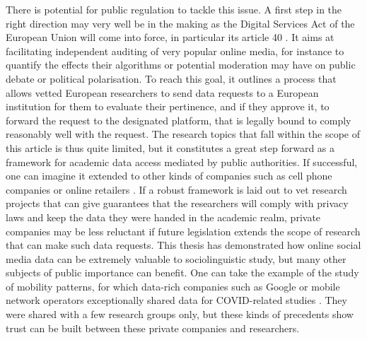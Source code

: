\documentclass[../thesis.tex]{subfiles}
\begin{document}
There is potential for public regulation to tackle this issue. A first step in the right
direction may very well be in the making as the Digital Services Act of the European
Union will come into force, in particular its article 40 \cite{DigitalServices2022}. It
aims at facilitating independent auditing of very popular online media, for instance to
quantify the effects their algorithms or potential moderation may have on public debate
or political polarisation. To reach this goal, it outlines a process that allows vetted
European researchers to send data requests to a European institution for them to
evaluate their pertinence, and if they approve it, to forward the request to the
designated platform, that is legally bound to comply reasonably well with the request.
The research topics that fall within the scope of this article is thus quite limited,
but it constitutes a great step forward as a framework for academic data access mediated
by public authorities. If successful, one can imagine it extended to other kinds of
companies such as cell phone companies or online retailers
\cite{PersilyProposalResearcher2021}. If a robust framework is laid out to vet research
projects that can give guarantees that the researchers will comply with privacy laws and
keep the data they were handed in the academic realm, private companies may be less
reluctant if future legislation extends the scope of research that can make such data
requests. This thesis has demonstrated how online social media data can be extremely
valuable to sociolinguistic study, but many other subjects of public importance can
benefit. One can take the example of the study of mobility patterns, for which data-rich
companies such as Google or mobile network operators exceptionally shared data for
COVID-related studies \cite{AguilarImpactUrban2022,GozziEstimatingEffect2021}. They were
shared with a few research groups only, but these kinds of precedents show trust can be
built between these private companies and researchers.


\end{document}
